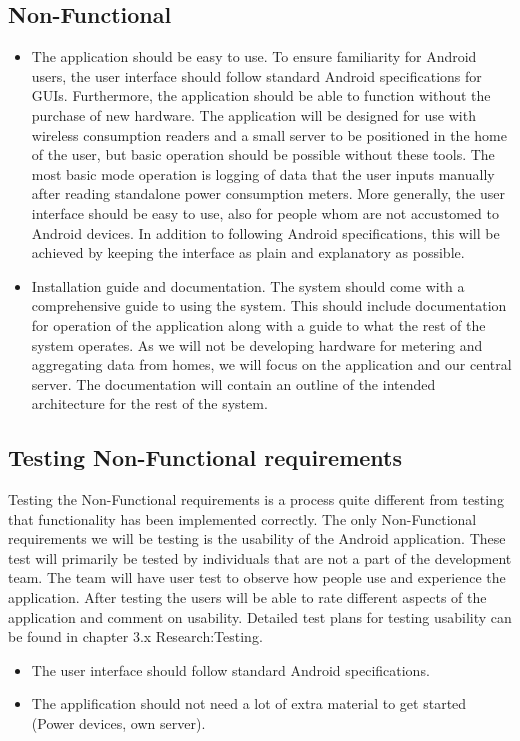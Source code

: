 \subsection{Non-Functional}

\begin{itemize}
\item The application should be easy to use.
To ensure familiarity for Android users, the user interface should follow standard Android specifications for GUIs. 
Furthermore, the application should be able to function without the purchase of new hardware. The application will be
designed for use with wireless consumption readers and a small server to be positioned in the home of the user, but basic
operation should be possible without these tools. The most basic mode operation is logging of data that 
the user inputs manually after reading standalone power consumption meters. 
More generally, the user interface should be easy to use, also for people whom are not accustomed to Android devices. In 
addition to following Android specifications, this will be achieved by keeping the interface as plain and explanatory as 
possible.
\end{itemize}

\begin{itemize}
\item Installation guide and documentation.
The system should come with a comprehensive guide to using the system. This should include documentation for operation of the
application along with a guide to what the rest of the system operates. As we will not be developing hardware for metering and 
aggregating data from homes, we will focus on the application and our central server. The documentation will contain an outline 
of the intended architecture for the rest of the system.
\end{itemize}

\subsection{Testing Non-Functional requirements}
Testing the Non-Functional requirements is a process quite different from testing that functionality has been implemented correctly.
The only Non-Functional requirements we will be testing is the usability of the Android application. These test will primarily be 
tested by individuals that are not a part of the development team. The team will have user test to observe how people use and experience 
the application. After testing the users will be able to rate different aspects of the application and comment on usability. Detailed 
test plans for testing usability can be found in chapter 3.x Research:Testing.

\begin{itemize}
\item The user interface should follow standard Android specifications. 
\item The applification should not need a lot of extra material to get started (Power devices, own server).
\end{itemize}

